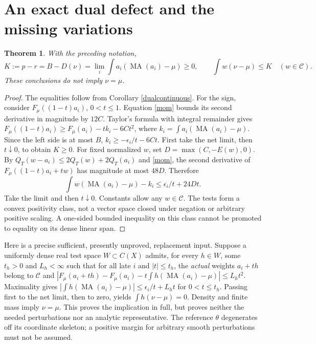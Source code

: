 \documentclass[11pt]{article}
\newtheorem{theorem}{Theorem}
\newcommand{\MA}{\operatorname{MA}}
\newcommand{\C}{\mathcal C}
\begin{document}
\section{An exact dual defect and the missing variations}
\begin{theorem}\label{defecttheorem}
With the preceding notation,
\[
 K:=p-r=B-D(\nu)=\lim_i\int a_i(\MA(a_i)-\mu)\ge0,
 \qquad \int w(\nu-\mu)\le K\quad(w\in\C).
\]
These conclusions do not imply $\nu=\mu$.
\end{theorem}
\begin{proof}
The equalities follow from Corollary \ref{dualcontinuous}. For the sign,
consider $F_\mu((1-t)a_i)$, $0<t\le1$. Equation \eqref{mom}
bounds its second derivative in magnitude by $12C$. Taylor's formula
with integral remainder gives
$F_\mu((1-t)a_i)\ge F_\mu(a_i)-t k_i-6Ct^2$,
where $k_i=\int a_i(\MA(a_i)-\mu)$.
Since the left side is at most $B$, $k_i\ge-\epsilon_i/t-6Ct$.
First take the net limit, then $t\downarrow0$, to obtain $K\ge0$.
For fixed normalized $w$, set $D=\max(C,-E(w),0)$.
By $Q_T(w-a_i)\le2Q_T(w)+2Q_T(a_i)$ and \eqref{mom},
the second derivative of $F_\mu((1-t)a_i+tw)$ has magnitude at
most $48D$. Therefore
\[
 \int w(\MA(a_i)-\mu)-k_i\le\epsilon_i/t+24Dt.
\]
Take the limit and then $t\downarrow0$. Constants allow any $w\in\C$.
The tests form a convex positivity class, not a vector space closed under
negation or arbitrary positive scaling. A one-sided bounded inequality
on this class cannot be promoted to equality on its dense linear span.
\end{proof}

Here is a precise sufficient, presently unproved, replacement input.
Suppose a uniformly dense real test space $W\subset C(X)$ admits,
for every $h\in W$, some $t_h>0$ and $L_h<\infty$ such that for
all late $i$ and $|t|\le t_h$, the \emph{actual} weights $a_i+th$
belong to $\C$ and
$|F_\mu(a_i+th)-F_\mu(a_i)-t\int h(\MA(a_i)-\mu)|\le L_ht^2$.
Maximality gives $|\int h(\MA(a_i)-\mu)|\le\epsilon_i/t+L_ht$
for $0<t\le t_h$. Passing first to the net limit, then to zero, yields
$\int h(\nu-\mu)=0$. Density and finite mass imply $\nu=\mu$.
This proves the implication in full, but proves neither the needed
perturbations nor an analytic representative. The reference $\theta$
degenerates off its coordinate skeleton; a positive margin for arbitrary
smooth perturbations must not be assumed.
\end{document}
